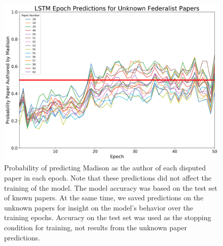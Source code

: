 \documentclass[11pt]{article}
\begin{document}
\begin{figure}[h]
	\centering
	\includegraphics[width=16cm]{epoch}
	\caption{\label{epoch pred} Probability of predicting Madison as the author of each disputed paper in each epoch. Note that these predictions did not affect the training of the model. The model accuracy was based on the test set of known papers. At the same time, we saved predictions on the unknown papers for insight on the model’s behavior over the training epochs. Accuracy on the test set was used as the stopping condition for training, not results from the unknown paper predictions.}
\end{figure}
\end{document}
